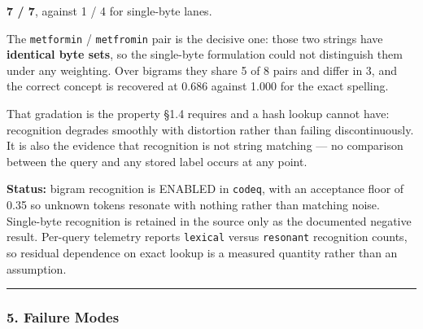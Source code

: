 \documentclass[
  11pt,
  a4paper,
]{article}
\begin{document}
\textbf{7 / 7}, against 1 / 4 for single-byte lanes.

The \texttt{metformin} / \texttt{metfromin} pair is the decisive one:
those two strings have \textbf{identical byte sets}, so the single-byte
formulation could not distinguish them under any weighting. Over bigrams
they share 5 of 8 pairs and differ in 3, and the correct concept is
recovered at 0.686 against 1.000 for the exact spelling.

That gradation is the property §1.4 requires and a hash lookup cannot
have: recognition degrades smoothly with distortion rather than failing
discontinuously. It is also the evidence that recognition is not string
matching --- no comparison between the query and any stored label occurs
at any point.

\textbf{Status:} bigram recognition is ENABLED in \texttt{codeq}, with
an acceptance floor of 0.35 so unknown tokens resonate with nothing
rather than matching noise. Single-byte recognition is retained in the
source only as the documented negative result. Per-query telemetry
reports \texttt{lexical} versus \texttt{resonant} recognition counts, so
residual dependence on exact lookup is a measured quantity rather than
an assumption.

\begin{center}\rule{0.5\linewidth}{0.5pt}\end{center}

\subsubsection{5. Failure Modes}\label{failure-modes-5}
\end{document}
